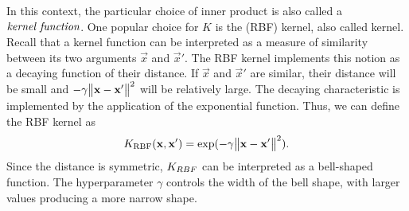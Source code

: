 \documentclass[
	fontsize=10pt, %
	twoside=true, %
	secnumdepth=1, %
  toc=indentunnumbered %
]{kaobook}
\begin{document}
In this context, the particular choice of inner product is also called a
${\textit{{kernel function}}}$.
%
%
One popular choice for $K$ is the  (RBF) kernel,
also called  kernel. Recall that a kernel function can be
interpreted as a measure of similarity between its two arguments $\vec x$ and
$\vec x'$. The RBF kernel implements this notion as a decaying function of their
distance. If $\vec x$ and $\vec x'$ are similar, their distance will be small and $-
\gamma \norm{\mathbf{x} - \mathbf{x}'}^2$ will be relatively large. The decaying
characteristic is implemented by the application of the exponential function.
Thus, we can define the RBF kernel as
\begin{align}
  K_{\text{RBF}} (\mathbf{x}, \mathbf{x}') = \exp( -\gamma \norm{\mathbf{x} - \mathbf{x}'}^2 ).
  \label{eq:rbf-kernel}
\end{align}
Since the distance is symmetric, $K_{RBF}$ can be interpreted as a bell-shaped
function.
The hyperparameter $\gamma$ controls the width of the bell shape, with
larger values producing a more narrow shape. 







\end{document}
